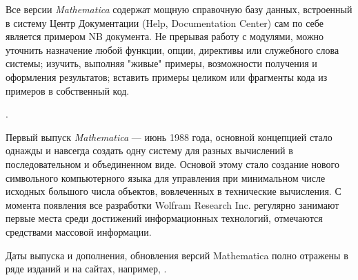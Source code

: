 Все версии \textit{Mathematica} содержат мощную справочную базу данных, встроенный в систему Центр Документации (Help, Documentation Center) сам по себе является примером NB документа. Не прерывая работу с модулями, можно уточнить назначение любой функции, опции, директивы или служебного слова системы; изучить, выполняя "живые"{} примеры, возможности получения и оформления результатов; вставить примеры целиком или фрагменты кода из примеров в собственный код.

.

Первый выпуск \textit{Mathematica} --- июнь 1988 года, основной концепцией стало однажды и навсегда создать одну систему для разных вычислений в последовательном и объединенном виде. Основой этому стало создание нового символьного компьютерного языка для управления при минимальном числе исходных большого числа объектов, вовлеченных в технические вычисления. С момента появления все разработки Wolfram Research Inc. регулярно занимают первые места среди достижений информационных технологий, отмечаются средствами массовой информации. 

Даты выпуска и дополнения, обновления версий Mathematica полно отражены в ряде изданий и на сайтах, например, .


